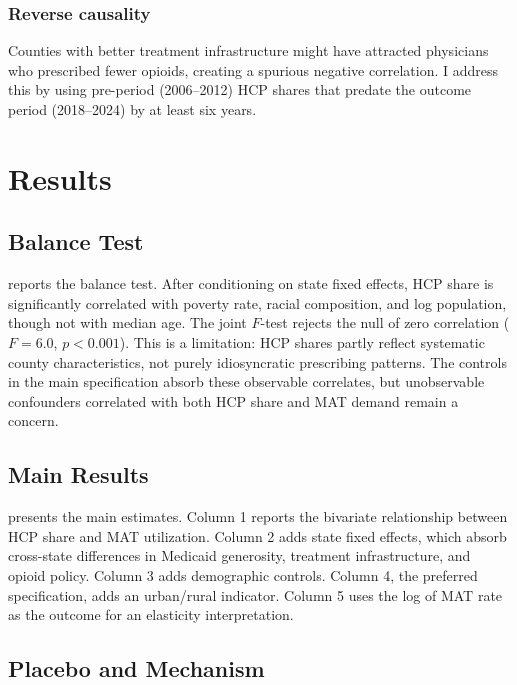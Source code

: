 \documentclass[12pt]{article}
\begin{document}
\subsubsection*{Reverse causality}  Counties with better treatment infrastructure might have attracted physicians who prescribed fewer opioids, creating a spurious negative correlation. I address this by using pre-period (2006--2012) HCP shares that predate the outcome period (2018--2024) by at least six years.

\section{Results}

\subsection{Balance Test}

 reports the balance test. After conditioning on state fixed effects, HCP share is significantly correlated with poverty rate, racial composition, and log population, though not with median age. The joint $F$-test rejects the null of zero correlation ($F = 6.0$, $p < 0.001$). This is a limitation: HCP shares partly reflect systematic county characteristics, not purely idiosyncratic prescribing patterns. The controls in the main specification absorb these observable correlates, but unobservable confounders correlated with both HCP share and MAT demand remain a concern.



\subsection{Main Results}

 presents the main estimates. Column 1 reports the bivariate relationship between HCP share and MAT utilization. Column 2 adds state fixed effects, which absorb cross-state differences in Medicaid generosity, treatment infrastructure, and opioid policy. Column 3 adds demographic controls. Column 4, the preferred specification, adds an urban/rural indicator. Column 5 uses the log of MAT rate as the outcome for an elasticity interpretation.



\subsection{Placebo and Mechanism}
\end{document}
